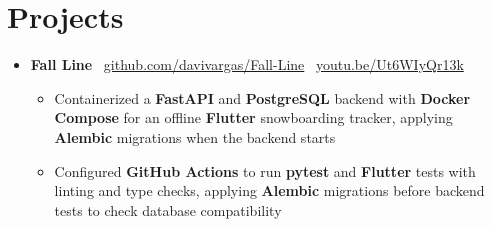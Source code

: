 \documentclass[letterpaper,11pt]{article}
\newcommand{\resumeItem}[1]{
  \item\small{
    {#1 \vspace{-2pt}}
  }
}
\newcommand{\resumeSubHeadingListStart}{\begin{itemize}[leftmargin=0.15in, label={}]}
\newcommand{\resumeSubHeadingListEnd}{\end{itemize}}
\newcommand{\resumeItemListStart}{\begin{itemize}}
\newcommand{\resumeItemListEnd}{\end{itemize}\vspace{-5pt}}
\begin{document}
\section{Projects}
    \resumeSubHeadingListStart
      \item
        \textbf{Fall Line} \textbar\
        \href{https://github.com/davivargas/Fall-Line}{github.com/davivargas/Fall-Line}
        \textbar\
        \href{https://www.youtube.com/watch?v=Ut6WIyQr13k}{youtu.be/Ut6WIyQr13k}
        \vspace{-4pt}
        \resumeItemListStart
          \resumeItem{Containerized a \textbf{FastAPI} and \textbf{PostgreSQL} backend with \textbf{Docker Compose} for an offline \textbf{Flutter} snowboarding tracker, applying \textbf{Alembic} migrations when the backend starts}
          \resumeItem{Configured \textbf{GitHub Actions} to run \textbf{pytest} and \textbf{Flutter} tests with linting and type checks, applying \textbf{Alembic} migrations before backend tests to check database compatibility}
      \resumeItemListEnd
    \resumeSubHeadingListEnd
\end{document}
